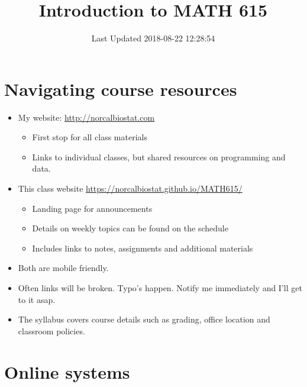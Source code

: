 \documentclass[]{article}
\title{Introduction to MATH 615}
\author{}
\date{Last Updated 2018-08-22 12:28:54}
\providecommand{\tightlist}{%
  \setlength{\itemsep}{0pt}\setlength{\parskip}{0pt}}
\begin{document}
\maketitle

\section{Navigating course resources}\label{navigating-course-resources}

\begin{itemize}
\tightlist
\item
  My website: \url{http://norcalbiostat.com}

  \begin{itemize}
  \tightlist
  \item
    First stop for all class materials
  \item
    Links to individual classes, but shared resources on programming and
    data.
  \end{itemize}
\item
  This class website \url{https://norcalbiostat.github.io/MATH615/}

  \begin{itemize}
  \tightlist
  \item
    Landing page for announcements
  \item
    Details on weekly topics can be found on the schedule
  \item
    Includes links to notes, assignments and additional materials
  \end{itemize}
\item
  Both are mobile friendly.
\item
  Often links will be broken. Typo's happen. Notify me immediately and
  I'll get to it asap.
\item
  The syllabus covers course details such as grading, office location
  and classroom policies.
\end{itemize}

\section{Online systems}\label{online-systems}
\end{document}
